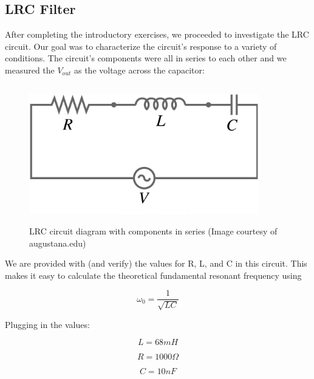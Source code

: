 \documentclass{article}
\begin{document}
\subsection{LRC Filter}%
\label{sub:lrc_filter}

After completing the introductory exercises, we proceeded to investigate the
LRC circuit. Our goal was to characterize the circuit's response to a variety
of conditions. The circuit's components were all in series to each other and we
measured the $V_{out}$ as the voltage across the capacitor:

\begin{figure}[H]
    \centering
\begin{minipage}{11cm}
\begin{tcolorbox}
    \centering
        \includegraphics[width=10cm, height=6cm]{figures/figure18.png}
        \caption{LRC circuit diagram with components in series (Image courtesy
        of augustana.edu)}
        \label{fig:fig18}
\end{tcolorbox}
\end{minipage}
\end{figure}

We are provided with (and verify) the values for R, L, and C in this circuit.
This makes it easy to calculate the theoretical fundamental resonant frequency
using

\begin{equation}
    \omega_0 = \frac{1}{\sqrt{LC}}
\end{equation}

Plugging in the values:

\begin{equation*}
    L = 68mH
\end{equation*}

\begin{equation*}
    R = 1000 \Omega
\end{equation*}

\begin{equation*}
    C = 10nF
\end{equation*}
\end{document}

